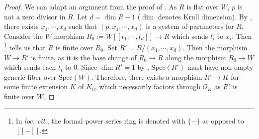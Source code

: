 \documentclass[letter, 11pt]{article}
\theoremstyle{plain}
\theoremstyle{definition}
\newcommand{\Spec}{\mathrm{Spec}}
\newcommand{\<}{\langle}
\renewcommand{\>}{\rangle}
\newcommand{\sO}{\mathcal{O}}
\begin{document}

\begin{proof}
    We can adapt an argument from the proof of \cite[Thm~1.6]{Del02}. As $R$ is flat over $W$, $p$ is not a zero divisor in $R$. Let $d = \dim R - 1$ ($\dim$ denotes Krull dimension). By \cite[0BWU]{stacks-project}, there exists $x_1, \cdots, x_d$ such that $(p, x_1, \cdots, x_d)$ is a system of parameters for $R$. Consider the $W$-morphism $R_0 := W[\![t_1, \cdots, t_d]\!] \to R$ which sends $t_i$ to $x_i$. Then \cite[Lem.~16]{Cohen}\footnote{In \textit{loc. cit.}, the formal power series ring is denoted with $\{ - \}$ as opposed to $[\![-]\!]$.} tells us that $R$ is finite over $R_0$. Set $R' = R / (x_1, \cdots, x_d)$. Then the morphism $W \to R'$ is finite, as it is the base change of $R_0 \to R$ along the morphism $R_0 \to W$ which sends each $t_i$ to $0$. Since $\dim R' = 1$ by \cite[02IE]{stacks-project}, $\Spec(R')$ must have non-empty generic fiber over $\Spec(W)$. Therefore, there exists a morphism $R' \to K$ for some finite extension $K$ of $K_0$, which necessarily factors through $\sO_K$ as $R'$ is finite over $W$. 
\end{proof}
\end{document}
